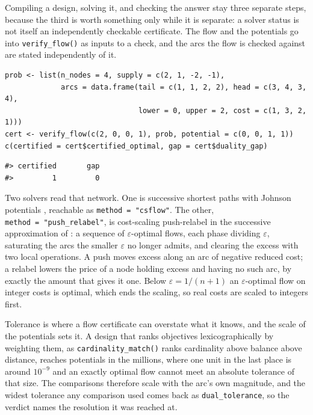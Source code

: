 Compiling a design, solving it, and checking the answer stay three separate
steps, because the third is worth something only while it is separate: a
solver status is not itself an independently checkable certificate. The flow and the potentials
go into \texttt{verify\_flow()} as inputs to a check, and the arcs the flow is checked
against are stated independently of it.

\begin{verbatim}
prob <- list(n_nodes = 4, supply = c(2, 1, -2, -1),
             arcs = data.frame(tail = c(1, 1, 2, 2), head = c(3, 4, 3, 4),
                               lower = 0, upper = 2, cost = c(1, 3, 2, 1)))
cert <- verify_flow(c(2, 0, 0, 1), prob, potential = c(0, 0, 1, 1))
c(certified = cert$certified_optimal, gap = cert$duality_gap)
\end{verbatim}

\begin{verbatim}
#> certified       gap 
#>         1         0
\end{verbatim}

Two solvers read that network. One is successive shortest paths with Johnson
potentials \citep{Johnson1977}, reachable as \texttt{method\ =\ "csflow"}. The other, \texttt{method\ =\ "push\_relabel"}, is cost-scaling push-relabel in the
successive approximation of \citet{GoldbergTarjan1990}: a sequence of
\(\varepsilon\)-optimal flows, each phase dividing \(\varepsilon\), saturating the
arcs the smaller \(\varepsilon\) no longer admits, and clearing the excess with
two local operations. A push moves excess along an arc of negative reduced
cost; a relabel lowers the price of a node holding excess and having no such
arc, by exactly the amount that gives it one. Below \(\varepsilon = 1/(n+1)\) an
\(\varepsilon\)-optimal flow on integer costs is optimal, which ends the
scaling, so real costs are scaled to integers first.

Tolerance is where a flow certificate can overstate what it knows, and the
scale of the potentials sets it. A design that ranks objectives lexicographically
by weighting them, as \texttt{cardinality\_match()} ranks cardinality above balance
above distance, reaches potentials in the millions, where one unit in the last
place is around \(10^{-9}\) and an exactly optimal flow cannot meet an absolute
tolerance of that size. The comparisons therefore scale with the arc's own
magnitude, and the widest tolerance any comparison used comes back as
\texttt{dual\_tolerance}, so the verdict names the resolution it was reached at.

